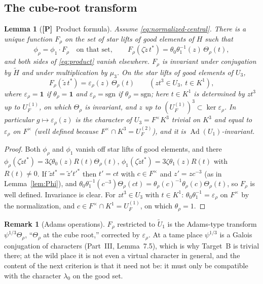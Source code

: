 \documentclass[11pt]{article}
\newcommand{\Ad}{\operatorname{Ad}}
\newcommand{\tH}{\widetilde H}
\newcommand{\tU}{\widetilde U}
\newcommand{\Ptag}{\textnormal{\textbf{[P]}}}
\theoremstyle{plain}
\newtheorem{lemma}[theorem]{Lemma}
\theoremstyle{definition}
\newtheorem{remark}[theorem]{Remark}
\begin{document}
\subsection{The cube-root transform}
\begin{lemma}[\Ptag\ Product formula]\label{lem:product}
Assume \eqref{eq:normalized-central}.  There is a unique function
$F_\rho$ on the set of star lifts of good elements of $H$ such that
\begin{equation}\label{eq:product}
 \phi_\rho=\phi_1\cdot F_\rho\quad\text{on that set},\qquad
 F_\rho(\zeta\tilde z\,t^*)=\theta_0\theta_1^{-1}(z)\,\Theta_\rho(t),
\end{equation}
and both sides of \eqref{eq:product} vanish elsewhere.  $F_\rho$ is
invariant under conjugation by $\tH$ and under multiplication by
$\mu_3$.  On the star lifts of good elements of $U_3$,
\begin{equation}\label{eq:Frho-U3}
 F_\rho(\tilde z\,t^*)=\varepsilon_\rho(z)\,\Theta_\rho(t)\qquad(zt^3\in U_3,\ t\in K^1),
\end{equation}
where $\varepsilon_\rho=\mathbf1$ if $\theta_\rho=\mathbf1$ and
$\varepsilon_\rho=\mathrm{sgn}$ if $\theta_\rho=\mathrm{sgn}$; here
$t\in K^1$ is determined by $zt^3$ up to $U_F^{(1)}$, on which
$\Theta_\rho$ is invariant, and $z$ up to $(U_F^{(1)})^3\subset\ker\varepsilon_\rho$.
In particular $g\mapsto\varepsilon_\rho(z)$ is the character of $U_3=F^\times K^3$
trivial on $K^3$ and equal to $\varepsilon_\rho$ on $F^\times$ (well
defined because $F^\times\cap K^3=U_F^{(2)}$), and it is $\Ad(U_1)$-invariant.
\end{lemma}
\begin{proof}
Both $\phi_\rho$ and $\phi_1$ vanish off star lifts of good elements, and
there $\phi_\rho(\zeta\tilde zt^*)=3\zeta\theta_0(z)R(t)\Theta_\rho(t)$,
$\phi_1(\zeta\tilde zt^*)=3\zeta\theta_1(z)R(t)$ with $R(t)\ne0$.  If
$\tilde zt^*=\tilde z't'^*$ then $t'=ct$ with $c\in F^\times$ and
$z'=zc^{-3}$ (as in Lemma~\ref{lem:Phi}), and
$\theta_0\theta_1^{-1}(c^{-3})\Theta_\rho(ct)=\theta_\rho(c)^{-1}\theta_\rho(c)\Theta_\rho(t)$,
so $F_\rho$ is well defined.  Invariance is clear.  For $zt^3\in U_3$
with $t\in K^1$: $\theta_0\theta_1^{-1}=\varepsilon_\rho$ on $F^\times$
by the normalization, and $c\in F^\times\cap K^1=U_F^{(1)}$, on which
$\theta_\rho=1$.
\end{proof}

\begin{remark}[Adams operations]
$F_\rho$ restricted to $\tU_1$ is the Adams-type transform
$\psi^{1/3}\Theta_\rho$, ``$\Theta_\rho$ at the cube root,'' corrected by
$\varepsilon_\rho$.  At a tame place $\psi^{1/3}$ is a Galois conjugation
of characters (Part~III, Lemma~7.5), which is why Target~B is trivial
there; at the wild place it is not even a virtual character in general,
and the content of the next criterion is that it need not be: it must
only be compatible with the character $\lambda_0$ on the good set.
\end{remark}
\end{document}
